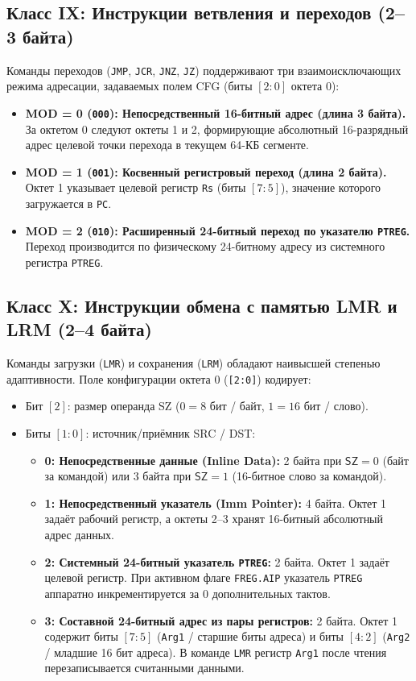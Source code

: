 \documentclass[11pt,a4paper]{article}
\newcommand{\reg}[1]{\texttt{#1}}
\newcommand{\bits}[1]{\texttt{#1}}
\newcommand{\field}[1]{\textsf{#1}}
\begin{document}
\subsection{Класс IX: Инструкции ветвления и переходов (2--3 байта)}
Команды переходов (\texttt{JMP}, \texttt{JCR}, \texttt{JNZ}, \texttt{JZ}) поддерживают три взаимоисключающих режима адресации, задаваемых полем \field{CFG} (биты $[2:0]$ октета 0):
\begin{itemize}
  \item \textbf{MOD = 0 (\bits{000}): Непосредственный 16-битный адрес (длина 3 байта).} За октетом 0 следуют октеты 1 и 2, формирующие абсолютный 16-разрядный адрес целевой точки перехода в текущем 64-КБ сегменте.
  \item \textbf{MOD = 1 (\bits{001}): Косвенный регистровый переход (длина 2 байта).} Октет 1 указывает целевой регистр \reg{Rs} (биты $[7:5]$), значение которого загружается в \reg{PC}.
  \item \textbf{MOD = 2 (\bits{010}): Расширенный 24-битный переход по указателю \reg{PTREG}.} Переход производится по физическому 24-битному адресу из системного регистра \reg{PTREG}.
\end{itemize}

\subsection{Класс X: Инструкции обмена с памятью LMR и LRM (2--4 байта)}
Команды загрузки (\texttt{LMR}) и сохранения (\texttt{LRM}) обладают наивысшей степенью адаптивности. 
Поле конфигурации октета 0 (\bits{[2:0]}) кодирует:
\begin{itemize}
  \item Бит $[2]$: размер операнда \field{SZ} ($0 = 8$ бит / байт, $1 = 16$ бит / слово).
  \item Биты $[1:0]$: источник/приёмник \field{SRC} / \field{DST}:
    \begin{itemize}
      \item \textbf{0: Непосредственные данные (Inline Data):} 2 байта при $\field{SZ}=0$ (байт за командой) или 3 байта при $\field{SZ}=1$ (16-битное слово за командой).
      \item \textbf{1: Непосредственный указатель (Imm Pointer):} 4 байта. Октет 1 задаёт рабочий регистр, а октеты 2--3 хранят 16-битный абсолютный адрес данных.
      \item \textbf{2: Системный 24-битный указатель \reg{PTREG}:} 2 байта. Октет 1 задаёт целевой регистр. При активном флаге \texttt{FREG.AIP} указатель \reg{PTREG} аппаратно инкрементируется за 0 дополнительных тактов.
      \item \textbf{3: Составной 24-битный адрес из пары регистров:} 2 байта. Октет 1 содержит биты $[7:5]$ (\reg{Arg1} / старшие биты адреса) и биты $[4:2]$ (\reg{Arg2} / младшие 16 бит адреса). В команде \texttt{LMR} регистр \reg{Arg1} после чтения перезаписывается считанными данными.
    \end{itemize}
\end{itemize}
\end{document}
